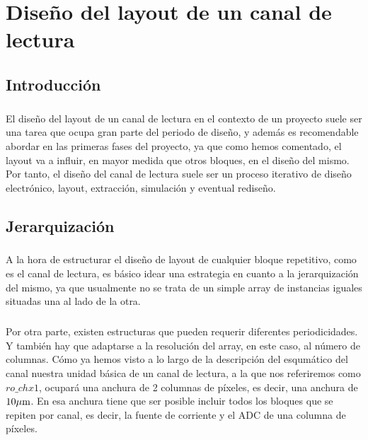 \chapter{Diseño del layout de un canal de lectura}

\section{Introducción}

\paragraph{}
El diseño del layout de un canal de lectura en el contexto de un proyecto suele
ser una tarea que ocupa gran parte del periodo de diseño, y además es recomendable
abordar en las primeras fases del proyecto, ya que como hemos comentado, el
layout va a influir, en mayor medida que otros bloques, en el diseño del mismo.
Por tanto, el diseño del canal de lectura suele ser un proceso iterativo de
diseño electrónico, layout, extracción, simulación y eventual rediseño.

\section{Jerarquización}
\paragraph{}
A la hora de estructurar el diseño de layout de cualquier bloque repetitivo, como
es el canal de lectura, es básico idear una estrategia en cuanto a la jerarquización
del mismo, ya que usualmente no se trata de un simple array de instancias iguales
situadas una al lado de la otra.

\paragraph{}
Por otra parte, existen estructuras que pueden requerir diferentes periodicidades.
Y también hay que adaptarse a la resolución del array, en este caso, al número de
columnas. Cómo ya hemos visto a lo largo de la descripción del esqumático del canal
nuestra unidad básica de un canal de lectura, a la que nos referiremos como
$ro\_chx1$, ocupará una anchura de 2 columnas de píxeles, es decir, una anchura
de $10\mu\text{m}$. En esa anchura tiene que ser posible incluir todos los bloques que
se repiten por canal, es decir, la fuente de corriente y el ADC de una columna de
píxeles.

